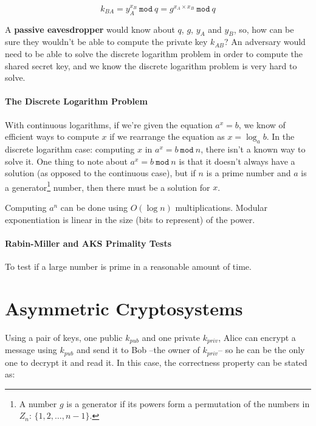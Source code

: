 \documentclass[12pt, letterpaper]{article}
\begin{document}
\[
  k_{BA} = y_A^{x_B} \: \mathtt{mod} \: q = g^{x_A \times x_B} \: \mathtt{mod} \: q
\]

A \textbf{passive eavesdropper} would know about $q$, $g$, $y_A$ and $y_B$, so, how can be sure they wouldn't be able to compute the private key $k_{AB}$?
An adversary would need to be able to solve the discrete logarithm problem in order to compute the shared secret key, and we know the discrete logarithm problem is very hard to solve.

\paragraph{The Discrete Logarithm Problem} With continuous logarithms, if we're given the equation $a^x = b$, we know of efficient ways to compute $x$ if we rearrange the equation as $x = \log_a b$.
In the discrete logarithm case: computing $x$ in $a^x = b \: \mathtt{mod} \: n$, there isn't a known way to solve it.
One thing to note about $a^x = b \: \mathtt{mod} \: n$ is that it doesn't always have a solution (as opposed to the continuous case), but if $n$ is a prime number and $a$ is a generator\footnote{A number $g$ is a generator if its powers form a permutation of the numbers in $Z_n$: $\lbrace 1, 2, \dots, n-1 \rbrace$.} number, then there must be a solution for $x$.

Computing $a^n$ can be done using $O(\log n)$ multiplications.
Modular exponentiation is linear in the size (bits to represent) of the power.

\paragraph{Rabin-Miller and AKS Primality Tests} To test if a large number is prime in a reasonable amount of time.


\section{Asymmetric Cryptosystems}

Using a pair of keys, one public $k_{pub}$ and one private $k_{priv}$, Alice can encrypt a message using $k_{pub}$ and send it to Bob --the owner of $k_{priv}$-- so he can be the only one to decrypt it and read it.
In this case, the correctness property can be stated as:
\end{document}
